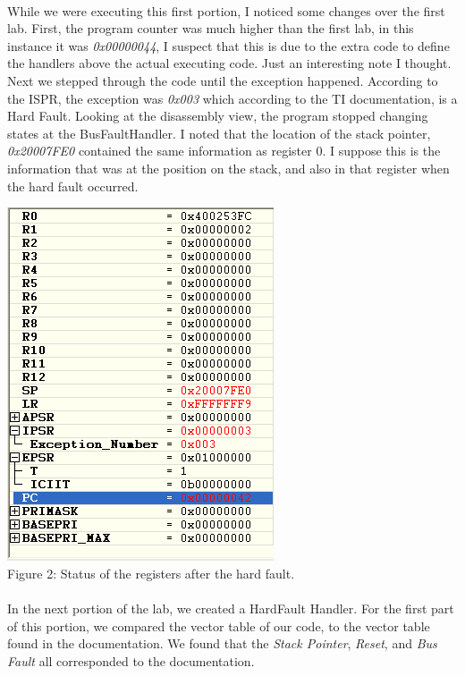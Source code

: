\documentclass[12pt,a4paper]{report}
\begin{document}
\paragraph{}
While we were executing this first portion, I noticed some changes over the first lab. First, the program counter was much higher than the first lab, in this instance it was \emph{0x00000044}, I suspect that this is due to the extra code to define the handlers above the actual executing code. Just an interesting note I thought. Next we stepped through the code until the exception happened. According to the ISPR, the exception was \emph{0x003} which according to the TI documentation, is a Hard Fault. Looking at the disassembly view, the program stopped changing states at the BusFaultHandler. I noted that the location of the stack pointer, \emph{0x20007FE0} contained the same information as register 0. I suppose this is the information that was at the position on the stack, and also in that register when the hard fault occurred. 

\begin{center}
\includegraphics[scale=0.7]{img/411-register-trimmed.png} \\
\small{Figure 2: Status of the registers after the hard fault.}
\end{center}

\paragraph{}
In the next portion of the lab, we created a HardFault Handler. For the first part of this portion, we compared the vector table of our code, to the vector table found in the documentation. We found that the \emph{Stack Pointer}, \emph{Reset}, and \emph{Bus Fault} all corresponded to the documentation. 
\end{document}
